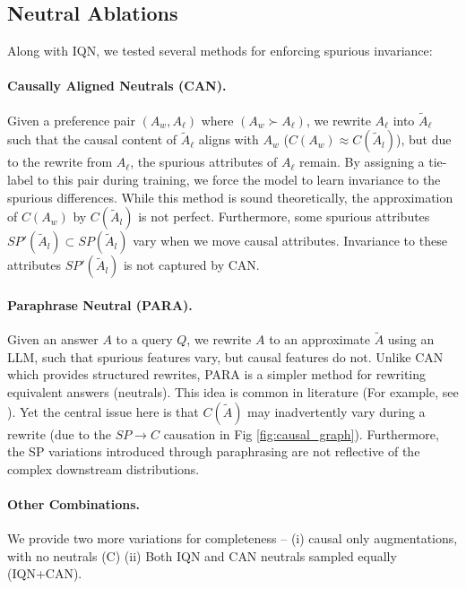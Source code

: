 \subsection{Neutral Ablations}
\label{ssec:neutral_ablations}

\vspace{-0.1in}
Along with IQN, we tested several methods for enforcing spurious invariance:

\vspace{-0.15in}
\paragraph{Causally Aligned Neutrals (CAN).} 
Given a preference pair $(A_w, A_\ell)$ where $(A_w \succ A_\ell)$, 
we rewrite $A_\ell$ into $\tilde{A}_\ell$ such that the causal content of $\tilde{A}_\ell$ aligns with $A_w$ ($C(A_w) \approx C(\tilde{A}_l)$), but due to the rewrite from $A_\ell$, the spurious attributes of $A_\ell$ remain. By assigning a tie-label to this pair during training, we force the model to learn invariance to the spurious differences. While this method is sound theoretically, the approximation of $C(A_w)$ by $C(\tilde{A}_l)$ is not perfect. Furthermore, some spurious attributes $SP'(\tilde{A}_l) \subset SP(\tilde{A}_l)$ vary when we move causal attributes. Invariance to these attributes $SP'(\tilde{A}_l)$ is not captured by CAN.


\vspace{-0.15in}
\paragraph{Paraphrase Neutral (PARA).} Given an answer $A$ to a query $Q$, we rewrite $A$ to an approximate $\tilde{A}$ using an LLM, such that spurious features vary, but causal features do not. Unlike CAN which provides structured rewrites, PARA is a simpler method for rewriting equivalent answers (neutrals). This idea is common in literature (For example, see \citet{wu2025rewordbench}). 
Yet the central issue here is that $C(\tilde{A})$ may inadvertently vary during a rewrite (due to the $SP\to C$ causation in Fig \ref{fig:causal_graph}). Furthermore, the SP variations introduced through paraphrasing  are not reflective of the complex downstream distributions.

\vspace{-0.15in}
\paragraph{Other Combinations.} We provide two more variations for completeness -- (i) causal only augmentations, with no neutrals (C) (ii) Both IQN and CAN neutrals sampled equally (IQN+CAN).

